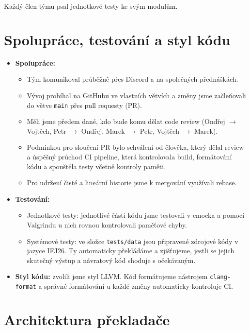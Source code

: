 \documentclass[a4paper,11pt]{article}
\begin{document}
\noindent Každý člen týmu psal jednotkové testy ke svým modulům.

\section{Spolupráce, testování a styl kódu}

\begin{itemize}
  \item \textbf{Spolupráce:}
    \begin{itemize}
      \item Tým komunikoval průběžně přes Discord a na společných přednáškách.
      \item Vývoj probíhal na GitHubu ve vlastních větvích a změny jsme
            začleňovali do větve \texttt{main} přes pull requesty (PR).
      \item Měli jsme předem dané, kdo bude komu dělat code review
            (Ondřej $\rightarrow$ Vojtěch,
            Petr $\rightarrow$ Ondřej, Marek $\rightarrow$ Petr,
            Vojtěch $\rightarrow$ Marek).
      \item Podmínkou pro sloučení PR bylo schválení od člověka, který dělal review
            a úspěšný průchod CI pipeline, která kontrolovala build,
            formátování kódu a spouštěla testy včetně kontroly paměti.
      \item Pro udržení čisté a lineární historie jsme k mergování
            využívali rebase.
    \end{itemize}
  \item \textbf{Testování:}
    \begin{itemize}
      \item Jednotkové testy: jednotlivé části kódu jsme testovali v cmocka
            a pomocí Valgrindu u nich rovnou kontrolovali paměťové chyby.
      \item Systémové testy: ve složce \texttt{tests/data} jsou připravené
            zdrojové kódy v jazyce IFJ26. Ty automaticky překládáme
            a zjišťujeme, jestli se jejich skutečný výstup a návratový kód
            shoduje s očekávaným.
    \end{itemize}
  \item \textbf{Styl kódu:} zvolili jsme styl LLVM. Kód formátujeme nástrojem
        \texttt{clang-format} a správné formátování u každé změny
        automaticky kontroluje CI.
\end{itemize}
\newpage
\section{Architektura překladače}
\end{document}

